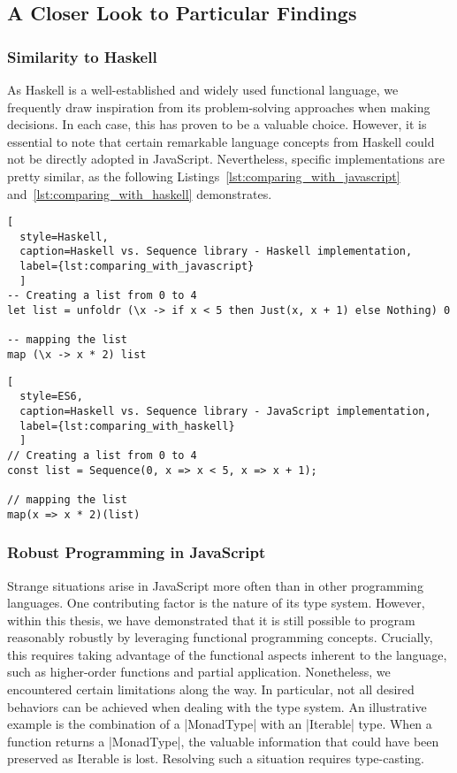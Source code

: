\subsection{A Closer Look to Particular Findings}
\label{A Closer Look to Particular Findings}

\subsubsection{Similarity to Haskell}
\label{subsub:Similarity to Haskell}
As Haskell is a well-established and widely used functional language, we
frequently draw inspiration from its problem-solving approaches when making
decisions. In each case, this has proven to be a valuable choice. However, it
is essential to note that certain remarkable language concepts from Haskell
could not be directly adopted in JavaScript. Nevertheless, specific
implementations are pretty similar, as the following Listings~\ref{lst:comparing_with_javascript} 
and~\ref{lst:comparing_with_haskell} demonstrates.

\begin{lstlisting}[
  style=Haskell, 
  caption=Haskell vs. Sequence library - Haskell implementation, 
  label={lst:comparing_with_javascript}
  ]
-- Creating a list from 0 to 4
let list = unfoldr (\x -> if x < 5 then Just(x, x + 1) else Nothing) 0

-- mapping the list
map (\x -> x * 2) list 
\end{lstlisting}

\begin{lstlisting}[
  style=ES6, 
  caption=Haskell vs. Sequence library - JavaScript implementation,
  label={lst:comparing_with_haskell}
  ]
// Creating a list from 0 to 4
const list = Sequence(0, x => x < 5, x => x + 1);

// mapping the list
map(x => x * 2)(list)
\end{lstlisting}


\subsubsection{Robust Programming in JavaScript}
\label{subsub:Robust Programming in JavaScript}
Strange situations arise in JavaScript more often than in other programming
languages. One contributing factor is the nature of its type system. However,
within this thesis, we have demonstrated that it is still possible to program
reasonably robustly by leveraging functional programming concepts. Crucially,
this requires taking advantage of the functional aspects inherent to the
language, such as higher-order functions and partial application. Nonetheless,
we encountered certain limitations along the way. In particular, not all
desired behaviors can be achieved when dealing with the type system.
An illustrative example is the combination of a |MonadType| with an |Iterable|
type. When a function returns a  |MonadType|, the valuable information that could
have been preserved as Iterable is lost. Resolving such a situation requires
type-casting.

